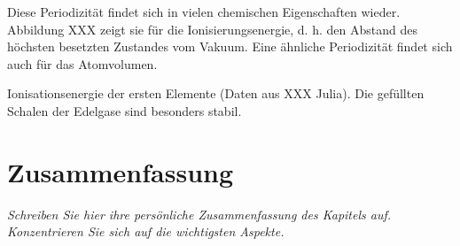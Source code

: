 Diese Periodizität findet sich in vielen chemischen Eigenschaften wieder. Abbildung XXX zeigt sie für die Ionisierungsenergie, d. h. den Abstand des höchsten besetzten Zustandes vom Vakuum. Eine ähnliche Periodizität findet sich auch für das Atomvolumen.

\begin{marginfigure}
    \caption{Ionisationsenergie der ersten Elemente (Daten aus XXX Julia). Die gefüllten Schalen der Edelgase sind besonders stabil.}
\end{marginfigure}


\section{Zusammenfassung}

\textit{Schreiben Sie hier ihre persönliche Zusammenfassung des Kapitels auf. Konzentrieren Sie sich auf die wichtigsten Aspekte.}

\vspace*{10cm}


\printbibliography[segment=\therefsegment,heading=subbibliography]

